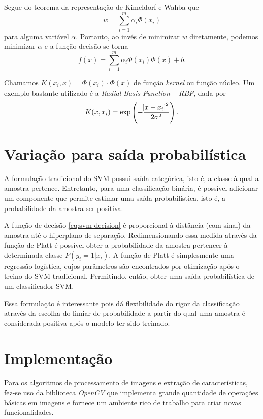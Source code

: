 Segue do teorema da representação de Kimeldorf e Wahba que
\begin{equation}
	\label{eq:teo-kimeldorf}
	w=\sum_{i=1}^m \alpha_i \Phi(x_i)
\end{equation}
para alguma variável $\alpha$. Portanto, ao invés de minimizar $w$ diretamente, podemos minimizar $\alpha$ e a função decisão se torna
\begin{equation}
	\label{eq:svm-decision-func}
	f(x)=\sum_{i=1}^m \alpha_i \Phi(x_i) \Phi(x) +b.
\end{equation}

Chamamos $K(x_i, x) = \Phi(x_i) \cdot \Phi(x)$ de função \textit{kernel} ou função núcleo. Um exemplo bastante utilizado é a \textit{Radial Basis Function -- RBF}, dada por
\begin{equation}
	\label{eq:svm-kernel-func}
	K(x,x_i) = \exp\left(-\frac{\abs{x-x_i}^2}{2\sigma^2}\right).
\end{equation}

\section{Variação para saída probabilística}
\label{sec:svm-probabilistic}
A formulação tradicional do SVM possui saída categórica, isto é, a classe à qual a amostra pertence. Entretanto, para uma classificação binária, é possível adicionar um componente que permite estimar uma saída probabilística, isto é, a probabilidade da amostra ser positiva.

A função de decisão \eqref{eq:svm-decision} é proporcional à distância (com sinal) da amostra até o hiperplano de separação. Redimensionando essa medida através da função de Platt \cite{svmProbabilisticOutput} é possível obter a probabilidade da amostra pertencer à determinada classe $P(y_i=1 | x_i)$. A função de Platt é simplesmente uma regressão logística, cujos parâmetros são encontrados por otimização após o treino do SVM tradicional. Permitindo, então, obter uma saída probabilística de um classificador SVM.

Essa formulação é interessante pois dá flexibilidade do rigor da classificação através da escolha do limiar de probabilidade a partir do qual uma amostra é considerada positiva após o modelo ter sido treinado.

\section{Implementação}
Para os algoritmos de processamento de imagens e extração de características, fez-se uso da biblioteca \textit{OpenCV} que implementa grande quantidade de operações básicas em imagens e fornece um ambiente rico de trabalho para criar novas funcionalidades.

